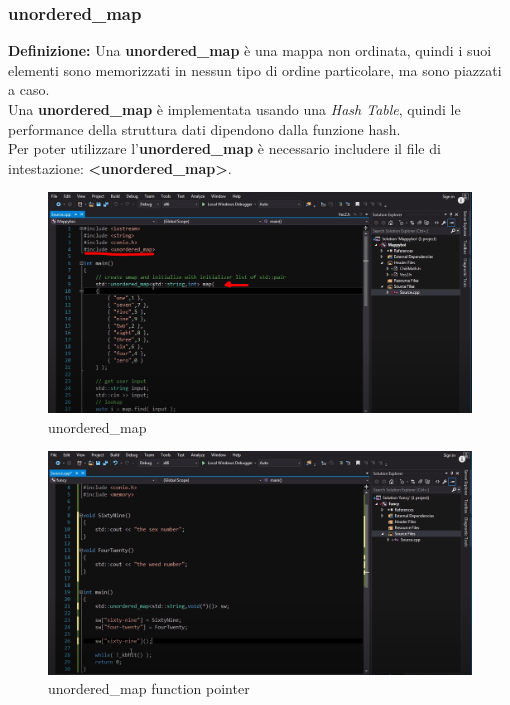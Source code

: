\subsubsection{unordered\_map} 

\textsf{\small \textbf{Definizione: } Una \textbf{unordered\_map} è una mappa non ordinata, quindi i suoi elementi sono memorizzati in nessun tipo di ordine particolare, ma sono piazzati a caso.} \\

\textsf{\small Una \textbf{unordered\_map} è implementata usando una \emph{Hash Table}, quindi le performance della struttura dati dipendono dalla funzione hash.} \\

\textsf{\small Per poter utilizzare l'\textbf{unordered\_map} è necessario includere il file di intestazione: \textbf{<unordered\_map>}.} \\

\begin{figure}[ht]
	\centering
	\includegraphics[width=1\textwidth, height=1\textheight, keepaspectratio]{./imgs/unordered_map_include_unordered_map_initialize_it.png}
	\caption{unordered\_map}
	\label{fig:unordered_map_include_unordered_map_initialize_it}
\end{figure}

\begin{figure}[ht]
	\centering
	\includegraphics[width=1\textwidth, height=1\textheight, keepaspectratio]{./imgs/function_pointers_unordered_map_pointer_to_a_function.png}
	\caption{unordered\_map function pointer}
	\label{fig:function_pointers_unordered_map_pointer_to_a_function}
\end{figure}

